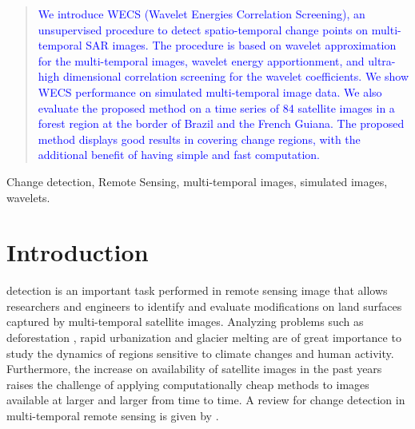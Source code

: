 \documentclass[journal]{IEEEtran}
\begin{document}




\maketitle


\begin{abstract}
\textcolor{blue}{We introduce WECS (Wavelet Energies Correlation Screening), an unsupervised procedure to detect spatio-temporal change points on multi-temporal SAR images. The procedure is based on wavelet approximation for the multi-temporal images, wavelet energy apportionment, and ultra-high dimensional correlation screening for the wavelet coefficients. We show WECS performance on simulated multi-temporal image data. We also evaluate the proposed method on a time series of 84 satellite images in a forest region at the border of Brazil and the French Guiana. The proposed method displays good results in covering change regions, with the additional benefit of having simple and fast computation.}
\end{abstract}

\begin{IEEEkeywords}
Change detection, Remote Sensing, multi-temporal images, simulated images, wavelets.
\end{IEEEkeywords}



%
\IEEEpeerreviewmaketitle



\section{Introduction}

 detection is an important task performed in remote sensing image that allows researchers and engineers to identify and evaluate modifications on land surfaces captured by multi-temporal satellite images. Analyzing problems such as deforestation \cite{barreto2016deforestation}, rapid urbanization \cite{ban2012multitemporal} and glacier melting \cite{scher2021mapping} are of great importance to study the dynamics of regions sensitive to climate changes and human activity. Furthermore, the increase on availability of satellite images in the past years raises the challenge of applying computationally cheap methods to images available at larger and larger from time to time. A review for change detection in multi-temporal remote sensing is given by \cite{ban2016change}.
\end{document}
